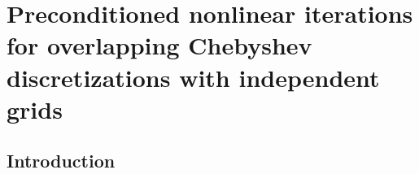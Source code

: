 \chapter{Preconditioned nonlinear iterations for overlapping Chebyshev discretizations with independent grids}
\label{snk_chap}
\section{Introduction}
\label{sec:introduction}


%


